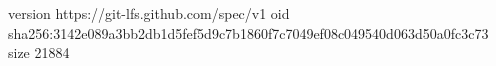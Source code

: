 version https://git-lfs.github.com/spec/v1
oid sha256:3142e089a3bb2db1d5fef5d9c7b1860f7c7049ef08c049540d063d50a0fc3c73
size 21884
